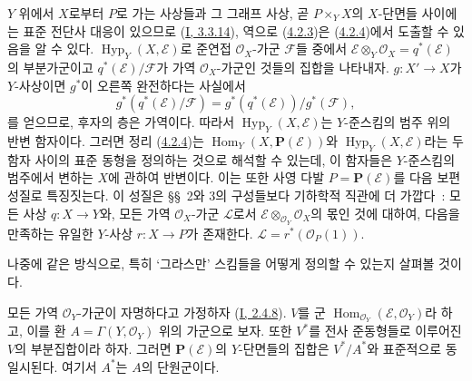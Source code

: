 \begin{remark}[4.2.5]
\label{II.4.2.5-ko}
$Y$ 위에서 $X$로부터 $P$로 가는 사상들과 그 그래프 사상, 곧
$P\times_YX$의 $X$-단면들 사이에는 표준 전단사 대응이 있으므로
(\hyperref[I.3.3.14-ko]{I, 3.3.14}), 역으로
(\hyperref[II.4.2.3-ko]{4.2.3})은
(\hyperref[II.4.2.4-ko]{4.2.4})에서 도출할 수 있음을 알 수 있다.
$\operatorname{Hyp}_Y(X,\mathcal{E})$로 준연접
$\mathcal{O}_X$-가군 $\mathcal{F}$들 중에서
$\mathcal{E}\otimes_Y\mathcal{O}_X=q^*(\mathcal{E})$의 부분가군이고
$q^*(\mathcal{E})/\mathcal{F}$가 가역 $\mathcal{O}_X$-가군인 것들의
집합을 나타내자. $g:X'\to X$가 $Y$-사상이면 $g^*$이 오른쪽
완전하다는 사실에서
\[
  g^*(q^*(\mathcal{E})/\mathcal{F})=
  g^*(q^*(\mathcal{E}))/g^*(\mathcal{F}),
\]
를 얻으므로, 후자의 층은 가역이다. 따라서
$\operatorname{Hyp}_Y(X,\mathcal{E})$는 $Y$-준스킴의 범주 위의 반변
함자이다. 그러면 정리 (\hyperref[II.4.2.4-ko]{4.2.4})는
$\operatorname{Hom}_Y(X,\mathbf{P}(\mathcal{E}))$와
$\operatorname{Hyp}_Y(X,\mathcal{E})$라는 두 함자 사이의 표준 동형을
정의하는 것으로 해석할 수 있는데, 이 함자들은 $Y$-준스킴의 범주에서
변하는 $X$에 관하여 반변이다. 이는 또한 사영 다발
$P=\mathbf{P}(\mathcal{E})$를 다음 보편 성질로 특징짓는다. 이 성질은
\S\S~2와 3의 구성들보다 기하학적 직관에 더 가깝다~: 모든 사상
$q:X\to Y$와, 모든 가역 $\mathcal{O}_X$-가군 $\mathcal{L}$로서
$\mathcal{E}\otimes_{\mathcal{O}_Y}\mathcal{O}_X$의 몫인 것에 대하여,
다음을 만족하는
유일한 $Y$-사상 $r:X\to P$가 존재한다.
$\mathcal{L}=r^*(\mathcal{O}_P(1))$.

나중에 같은 방식으로, 특히 ‘그라스만’ 스킴들을 어떻게 정의할
수 있는지 살펴볼 것이다.
\end{remark}

\begin{corollary}[4.2.6]
\label{II.4.2.6-ko}
모든 가역 $\mathcal{O}_Y$-가군이 자명하다고 가정하자
(\hyperref[I.2.4.8-ko]{I, 2.4.8}).
$V$를 군 $\operatorname{Hom}_{\mathcal{O}_Y}(\mathcal{E},\mathcal{O}_Y)$라
하고, 이를 환 $A=\Gamma(Y,\mathcal{O}_Y)$ 위의 가군으로 보자. 또한
$V^*$를 전사 준동형들로 이루어진 $V$의 부분집합이라 하자. 그러면
$\mathbf{P}(\mathcal{E})$의 $Y$-단면들의 집합은 $V^*/A^*$와
표준적으로 동일시된다. 여기서 $A^*$는 $A$의 단원군이다.
\end{corollary}


